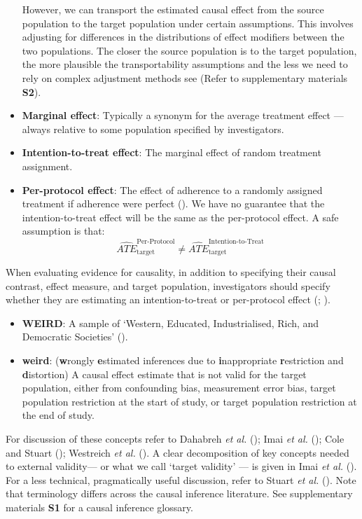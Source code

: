 \documentclass[
  single column]{article}
\begin{document}
\begin{itemize}
  However, we can transport the estimated causal effect from the source
  population to the target population under certain assumptions. This
  involves adjusting for differences in the distributions of effect
  modifiers between the two populations. The closer the source
  population is to the target population, the more plausible the
  transportability assumptions and the less we need to rely on complex
  adjustment methods see (Refer to supplementary materials \textbf{S2}).
\item
  \textbf{Marginal effect}: Typically a synonym for the average
  treatment effect --- always relative to some population specified by
  investigators.
\item
  \textbf{Intention-to-treat effect}: The marginal effect of random
  treatment assignment.
\item
  \textbf{Per-protocol effect}: The effect of adherence to a randomly
  assigned treatment if adherence were perfect
  (). We have no
  guarantee that the intention-to-treat effect will be the same as the
  per-protocol effect. A safe assumption is that: \[
  \widehat{ATE}_{\text{target}}^{\text{Per-Protocol}} \ne \widehat{ATE}_{\text{target}}^{\text{Intention-to-Treat}}
  \]
\end{itemize}

When evaluating evidence for causality, in addition to specifying their
causal contrast, effect measure, and target population, investigators
should specify whether they are estimating an intention-to-treat or
per-protocol effect (;
).

\begin{itemize}
\item
  \textbf{WEIRD}: A sample of `Western, Educated, Industrialised, Rich,
  and Democratic Societies' ().
\item
  \textbf{weird}: (\textbf{w}rongly \textbf{e}stimated inferences due to
  \textbf{i}nappropriate \textbf{r}estriction and \textbf{d}istortion) A
  causal effect estimate that is not valid for the target population,
  either from confounding bias, measurement error bias, target
  population restriction at the start of study, or target population
  restriction at the end of study.
\end{itemize}

For discussion of these concepts refer to Dahabreh \emph{et al.}
(); Imai \emph{et al.}
(); Cole and Stuart
(); Westreich \emph{et al.}
(). A clear
decomposition of key concepts needed to external validity--- or what we
call `target validity' --- is given in Imai \emph{et al.}
(). For a less technical,
pragmatically useful discussion, refer to Stuart \emph{et al.}
(). Note that terminology
differs across the causal inference literature. See supplementary
materials \textbf{S1} for a causal inference glossary.
\end{document}
